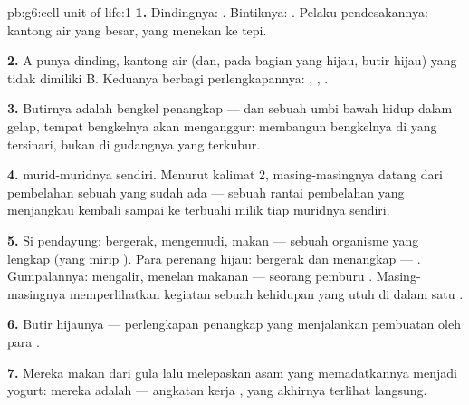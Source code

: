 \begin{solution}{pb:g6:cell-unit-of-life:1}
\textbf{1.} Dindingnya:  . Bintiknya: . Pelaku pendesakannya: kantong air yang besar, yang menekan
 ke tepi.

\textbf{2.} A punya dinding, kantong air (dan, pada bagian yang hijau,
butir hijau) yang tidak dimiliki B. Keduanya berbagi perlengkapannya:
, , .

\textbf{3.} Butirnya adalah bengkel penangkap  --- dan sebuah
umbi bawah  hidup dalam gelap, tempat bengkelnya akan menganggur:
 membangun bengkelnya di  yang tersinari, bukan di
gudangnya yang terkubur.

\textbf{4.}  murid-muridnya sendiri. Menurut kalimat 2,
masing-masingnya datang dari pembelahan sebuah  yang sudah ada ---
sebuah rantai pembelahan yang menjangkau kembali sampai ke 
terbuahi milik tiap muridnya sendiri.

\textbf{5.} Si pendayung: bergerak, mengemudi, makan --- sebuah
organisme  yang lengkap (yang mirip ). Para
perenang hijau: bergerak dan menangkap  ---  . Gumpalannya: mengalir, menelan makanan --- seorang pemburu
. Masing-masingnya memperlihatkan kegiatan sebuah
kehidupan yang utuh di dalam satu .

\textbf{6.} Butir hijaunya --- perlengkapan penangkap  yang
menjalankan pembuatan oleh para .

\textbf{7.} Mereka makan dari gula  lalu melepaskan asam yang
memadatkannya menjadi yogurt: mereka adalah   --- angkatan kerja , yang akhirnya terlihat langsung.


\end{solution}
